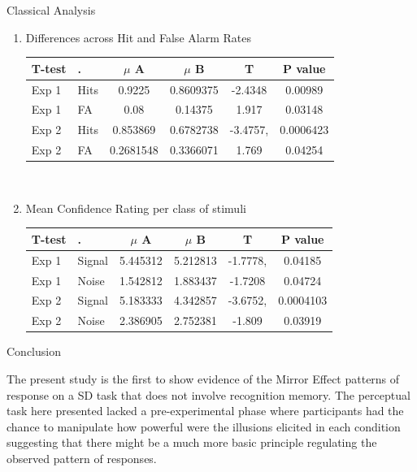 \documentclass[final]{beamer}
\newlength{\onecolwid}
\begin{document}
\begin{frame}[t]
\begin{columns}[t]
\begin{column}{\onecolwid}
\begin{alertblock}{Classical Analysis}
\begin{enumerate}
\item Differences across Hit and False Alarm Rates
\begin{table}
\vspace{3ex}
\begin{tabular}{l l | c c c c}
\toprule
\textbf{T-test} & \textbf{.} & \textbf{$\mu$ A} & \textbf{$\mu$ B} & \textbf{T} & \textbf{P value}\\
\midrule
Exp 1 & Hits & 0.9225 & 0.8609375 & -2.4348 & 0.00989 \\
Exp 1 & FA & 0.08 & 0.14375 & 1.917 & 0.03148 \\
Exp 2 & Hits & 0.853869 & 0.6782738 & -3.4757, & 0.0006423 \\
Exp 2 & FA & 0.2681548 & 0.3366071 & 1.769 & 0.04254 \\
\bottomrule
\end{tabular}
\end{table}

$\quad$

\item Mean Confidence Rating per class of stimuli
\begin{table}
\vspace{3ex}
\begin{tabular}{l l |  c c c c}
\toprule
\textbf{T-test} & \textbf{.} & \textbf{$\mu$ A} & \textbf{$\mu$ B} & \textbf{T} & \textbf{P value}\\
\midrule
Exp 1 & Signal & 5.445312 & 5.212813 & -1.7778, & 0.04185 \\
Exp 1 & Noise & 1.542812 & 1.883437 & -1.7208 & 0.04724 \\
Exp 2 & Signal & 5.183333 & 4.342857  & -3.6752, & 0.0004103 \\
Exp 2 & Noise & 2.386905 & 2.752381 & -1.809 & 0.03919 \\
\bottomrule
\end{tabular}
\end{table}
\end{enumerate}
\end{alertblock}




\begin{alertblock}{Conclusion}

The present study is the first to show evidence of the Mirror Effect patterns of response on a SD task that does not involve recognition memory. The perceptual task here presented lacked a pre-experimental phase where participants had the chance to manipulate how powerful were the illusions elicited in each condition suggesting that there might be a much more basic principle regulating the observed pattern of responses.


\end{alertblock}
\end{column}
\end{columns}
\end{frame}
\end{document}
